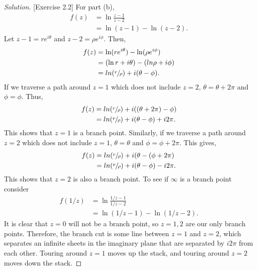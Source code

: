 \documentclass[11pt,letterpaper]{article}
\newenvironment{solution}
{\renewcommand\qedsymbol{}\begin{proof}[Solution]}
	{\end{proof}\bigskip}
\begin{document}
\begin{solution}[Exercise 2.2]
		For part (b),
		\[\begin{split}
			f(z) &= \ln\frac{z-1}{z-2}\\
			&= \ln(z-1)- \ln(z-2).
		\end{split}\]
		Let $z - 1 = re^{i\theta}$ and $z-2 = \rho e^{i\phi}$. Then,
		\[\begin{split}
			f(z) &= \ln(re^{i\theta})- \ln(\rho e^{i\phi})\\
			&= (\ln r + i\theta) - (ln\rho + i\phi)\\
			&= ln(\sfrac{r}{\rho}) + i(\theta - \phi).
		\end{split}\]
		If we traverse a path around $z = 1$ which does not include $z = 2$, $\theta = \theta +2\pi$ and $\phi = \phi$. Thus,
		\[\begin{split}
			f(z) &= ln(\sfrac{r}{\rho}) + i((\theta +2\pi) - \phi)\\
			 &= ln(\sfrac{r}{\rho}) + i(\theta - \phi) + i2\pi.
		\end{split}\]
		This shows that $z = 1$ is a branch point. Similarly, if  we traverse a path around $z = 2$ which does not include $z = 1$, $\theta = \theta $ and $\phi = \phi +2\pi$. This gives,
		\[\begin{split}
			f(z) &= ln(\sfrac{r}{\rho}) + i(\theta - (\phi + 2\pi)\\
			&= ln(\sfrac{r}{\rho}) + i(\theta - \phi) - i2\pi.
		\end{split}\]
		This shows that $z = 2$ is also a branch point. To see if $\infty$ is a branch point consider 
		\[\begin{split}
			f(1/z) &= \ln\frac{1/z-1}{1/z-2}\\
			&= \ln(1/z-1)- \ln(1/z-2).
		\end{split}\]
		It is clear that $z = 0$ will not be a branch point, so $z = 1,2$ are our only branch points. Therefore, the branch cut is some line between $z=1$ and $z=2$, which separates an infinite sheets in the imaginary plane that are separated by $i2\pi$ from each other. Touring around $z=1$ moves up the stack, and touring around $z=2$ moves down the stack. 
	\end{solution}
\end{document}
